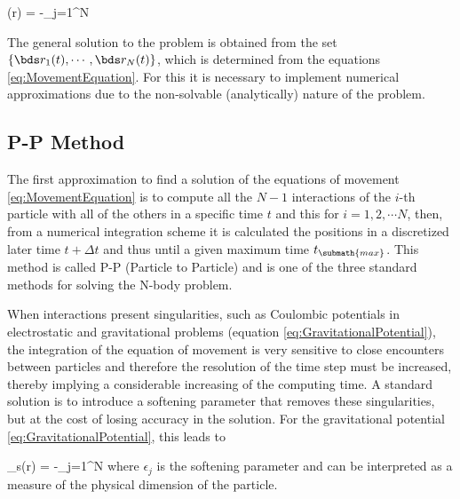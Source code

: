 { \phi(\bds r) = -\sum_{j=1}^N   }


The general solution to the problem is obtained from the set $\{ \bds 
r_1(t),\cdots, \bds r_N(t) \}$, which is determined from the equations
\ref{eq:MovementEquation}. For this it is necessary to implement numerical
approximations due to the non-solvable (analytically) nature of the 
problem.



	\subsection{P-P Method}
	\label{subsec:PPMethod}
	
	
The first approximation to find a solution of the equations of movement
\ref{eq:MovementEquation} is to compute all the $N-1$ interactions of the
$i$-th particle with all of the others in a specific time $t$ and this for
$i=1,2,\cdots N$, then, from a numerical integration scheme it is 
calculated the positions in a discretized later time $t+\Delta t$ and thus
until a given maximum time $t_{\submath{max}}$. This method is called P-P 
(Particle to Particle) and is one of the three standard methods for 
solving the N-body problem.


When interactions present singularities, such as Coulombic potentials in
electrostatic and gravitational problems (equation 
\ref{eq:GravitationalPotential}), the integration of the equation of 
movement is very sensitive to close encounters between particles and 
therefore the resolution of the time step must be increased, thereby 
implying a considerable increasing of the computing time. A standard 
solution is to introduce a softening parameter that removes these 
singularities, but at the cost of losing accuracy in the solution. For the
gravitational potential \ref{eq:GravitationalPotential}, this leads to


{ \phi_{s}(\bds r) = -\sum_{j=1}^N   }
where $\epsilon_j$ is the softening parameter and can be interpreted as a
measure of the physical dimension of the particle.


